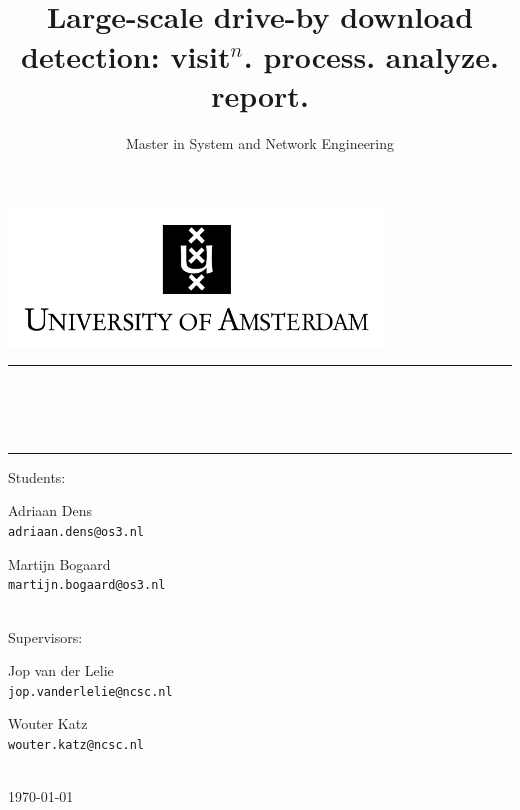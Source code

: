 \documentclass{scrartcl}
\title{\horizontalrule{1pt}\\[0.5cm]Large-scale drive-by download detection: visit$^n$. process. analyze. report.}
\subtitle{Master in System and Network Engineering \\[0.5cm] \horizontalrule{1pt} }
\author{}
\date{}
\newcommand{\horizontalrule}[1]{\rule{\linewidth}{#1}}
\begin{document}

\centerline{\includegraphics[width=10cm]{Images/UvA-logo-english}}

\begin{center}
\horizontalrule{1pt}\\[0.5cm]
\\[0.1cm]
 \\[0.5cm]
\horizontalrule{1pt} 
\end{center}

\vspace{7cm}

\begin{center}

\Large
Students:\\[0.5cm]

\begin{minipage}{0.4\textwidth}
\begin{flushleft} \Large
Adriaan Dens\\\texttt{adriaan.dens@os3.nl}
\end{flushleft}
\end{minipage}%
\begin{minipage}{0.4\textwidth}
\begin{flushright} \Large
Martijn Bogaard\\\texttt{martijn.bogaard@os3.nl}
\end{flushright}
\end{minipage}\\[1.6cm]

\Large
Supervisors:\\[0.5cm]

\begin{minipage}{0.4\textwidth}
\begin{flushleft} \Large
Jop van der Lelie\\\texttt{jop.vanderlelie@ncsc.nl}
\end{flushleft}
\end{minipage}%
\begin{minipage}{0.4\textwidth}
\begin{flushright} \Large
Wouter Katz\\\texttt{wouter.katz@ncsc.nl}
\end{flushright}
\end{minipage}\\[1.6cm]

{\Large \today}
\end{center}
\end{document}
